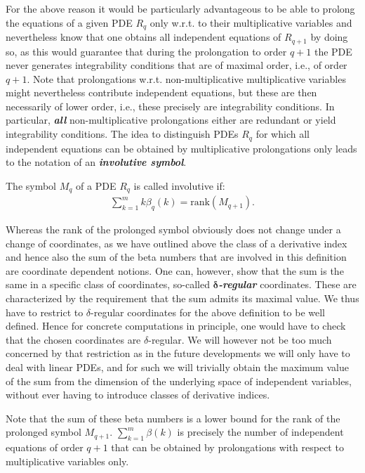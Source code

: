 For the above reason it would be particularly advantageous to be able to prolong the equations of a given PDE $R_q$ only w.r.t. to their multiplicative variables and nevertheless know that one obtains all independent equations of $R_{q+1}$ by doing so, as this would  guarantee that during the prolongation to order $q+1$ the PDE never generates integrability conditions that are of maximal order, i.e., of order $q+1$.
Note that prolongations w.r.t. non-multiplicative multiplicative variables might nevertheless contribute independent equations, but these are then necessarily of lower order, i.e., these precisely are integrability conditions.
In particular, \textit{\textbf{all}} non-multiplicative prolongations either are redundant or yield integrability conditions.
The idea to distinguish PDEs $R_q$ for which all independent equations can be obtained by multiplicative prolongations only leads to the notation of an \textit{\textbf{involutive symbol}}. 
\begin{definition}
The symbol $M_q$ of a PDE $R_q$ is called involutive if:
\begin{align}\label{sumBeta}
    \sum_{k=1}^m k\beta_q(k) = \mathrm{rank}(M_{q+1}).
\end{align}
\end{definition}
\begin{remark}
Whereas the rank of the prolonged symbol obviously does not change under a change of coordinates,
as we have outlined above the class of a derivative index and hence also the sum of the beta numbers that are involved in this definition are coordinate dependent notions. One can, however, show that the sum is the same in a specific class of coordinates, so-called \textit{\textbf{$\boldsymbol{\delta}$-regular}} coordinates. These are characterized by the requirement that the sum admits its maximal value.
We thus have to restrict to $\delta$-regular coordinates for the above definition to be well defined.
Hence for concrete computations in principle, one would have to check that the chosen coordinates are $\delta$-regular.  We will however not be too much concerned by that restriction as in the future developments we will only have to deal with linear PDEs, and for such we will trivially obtain the maximum value of the sum from the dimension of the underlying space of independent variables, without ever having to introduce classes of derivative indices.
\end{remark}
Note that the sum of these beta numbers is a lower bound for the rank of the prolonged symbol $M_{q+1}$. $\sum_{k=1}^m \beta(k)$ is precisely the number of independent equations of order $q+1$ that can be obtained by prolongations with respect to multiplicative variables only.  

